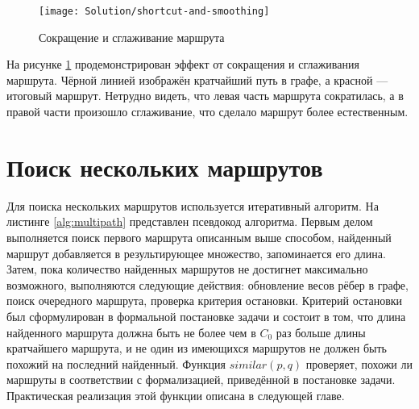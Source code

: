 \begin{figure}
    \texttt{[image: Solution/shortcut-and-smoothing]}
    \caption{Сокращение и сглаживание маршрута}
    \label{fig:path-improvements}
\end{figure}

На рисунке \ref{fig:path-improvements} продемонстрирован эффект от
сокращения и сглаживания маршрута. Чёрной линией изображён кратчайший
путь в графе, а красной --- итоговый маршрут. Нетрудно видеть, что
левая часть маршрута сократилась, а в правой части произошло
сглаживание, что сделало маршрут более естественным.

\FloatBarrier

\section{Поиск нескольких маршрутов}

\label{sec:multi-search}

Для поиска нескольких маршрутов используется итеративный алгоритм. На
листинге \ref{alg:multipath} представлен псевдокод алгоритма. Первым
делом выполняется поиск первого маршрута описанным выше способом,
найденный маршрут добавляется в результирующее множество, запоминается
его длина. Затем, пока количество найденных маршрутов не достигнет
максимально возможного, выполняются следующие действия: обновление
весов рёбер в графе, поиск очередного маршрута, проверка критерия
остановки. Критерий остановки был сформулирован в формальной
постановке задачи и состоит в том, что длина найденного маршрута
должна быть не более чем в $C_0$ раз больше длины кратчайшего
маршрута, и не один из имеющихся маршрутов не должен быть похожий на
последний найденный. Функция $similar(p, q)$ проверяет, похожи ли
маршруты в соответствии с формализацией, приведённой в постановке
задачи. Практическая реализация этой функции описана в следующей
главе.

